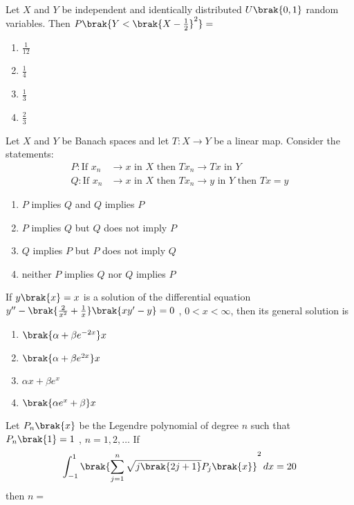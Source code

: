     \item Let $X$ and $Y$ be independent and identically distributed $U\brak{0,1}$ random variables. Then $P\brak{Y < \brak{X - \frac{1}{2}}^2} = $
	\hfill{}

	\begin{enumerate}
		\item $\frac{1}{12}$
		\item $\frac{1}{4}$
		\item $\frac{1}{3}$
		\item $\frac{2}{3}$
	\end{enumerate}


    \item Let $X$ and $Y$ be Banach spaces and let $T\colon X \to Y$ be a linear map. Consider the statements:
	\begin{align*}
		P\colon \text{If } x_n &\to x \text{ in } X \text{ then } Tx_n \to Tx \text{ in } Y\\
		Q\colon \text{If } x_n &\to x \text{ in } X \text{ then } Tx_n \to y \text{ in } Y \text{ then } Tx = y
	\end{align*}

	\hfill{}
	\begin{enumerate}
		\item $P$ implies $Q$ and $Q$ implies $P$
		\item $P$ implies $Q$ but $Q$ does not imply $P$
		\item $Q$ implies $P$ but $P$ does not imply $Q$
		\item neither $P$ implies $Q$ nor $Q$ implies $P$
	\end{enumerate}


    \item If $y\brak{x} = x$ is a solution of the differential equation $y^{\prime\prime} - \brak{\frac{2}{x^2}+\frac{1}{x}}\brak{xy^{\prime} - y} = 0$ , $0<x<\infty$, then its general solution is
	\hfill{}

	\begin{enumerate}
		\item $\brak{\alpha + \beta e^{-2x}}x$
		\item $\brak{\alpha + \beta e^{2x}}x$
		\item $\alpha x + \beta e^{x}$
		\item $\brak{\alpha e^{x} + \beta}x$
	\end{enumerate}


    \item Let $P_n\brak{x}$ be the Legendre polynomial of degree $n$ such that $P_n\brak{1} = 1$ , $n = 1, 2, \dots$ If
	\begin{align*}
		\int_{-1}^{1} \brak{\sum_{j = 1}^{n} \sqrt{j\brak{2j + 1}} P_j\brak{x}}^2 \, dx = 20
	\end{align*}
	then $n = $
	\hfill{}

